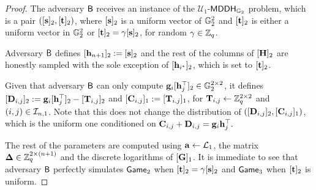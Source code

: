 \begin{proof}
The adversary $\mathsf{B}$ receives an instance of the $\mathcal{U}_1$-$\mathsf{MDDH}_{\mathbb{G}_2}$ problem, which is a pair
$([\mathbf{s}]_2, [\mathbf{t}]_2)$, where $[\mathbf{s}]_2$ is a uniform vector 
of $\mathbb{G}_2^{2}$ and $[\mathbf{t}]_2$ is either a uniform vector in $\mathbb{G}_2^2$ or 
$[\mathbf{t}]_2=\gamma[\mathbf{s}]_2$, for random $\gamma\in\mathbb{Z}_q$.      
 
Adversary $\mathsf{B}$ defines 
$[\mathbf{h}_{n+1}]_2:= [\mathbf{s}]_2$ and the rest of the columns of $[{\mathbf{{H}}}]_2$ are honestly sampled
with the sole exception of $[\mathbf{h}_{i^*}]_2$, which is set to $[\mathbf{t}]_2$.

Given that adversary $\mathsf{B}$ can only compute $\mathbf{g}_{i}[\mathbf{h}_j^\top]_2\in\mathbb{G}_2^{2\times2}$,
it defines $[\mathbf{{D}}_{i,j}]_2 := \mathbf{g}_{i}[\mathbf{h}_j^\top]_2 - [\mathbf{{T}}_{i,j}]_2$ and
$[\mathbf{{C}}_{i,j}]_1:=[\mathbf{{T}}_{i,j}]_1$, for $\mathbf{{T}}_{i,j}\gets\mathbb{Z}_q^{2\times 2}$ and $(i,j)\in\mathcal{I}_{n,1}$. Note 
that this does not change the distribution of $([\mathbf{{D}}_{i,j}]_2,[\mathbf{{C}}_{i,j}]_1)$, which is the uniform one conditioned
on $\mathbf{{C}}_{i,j}+\mathbf{{D}}_{i,j}= \mathbf{g}_i\mathbf{h}_j^\top.$

The rest of the parameters are computed using $\mathbf{a}\gets\mathcal{L}_1$,
the matrix $\mathbf{{\Delta}} \in \mathbb{Z}_q^{2 \times (n+1)}$ and the discrete logarithms
of $[\mathbf{{G}}]_1$.
It is immediate to see that adversary $\mathsf{B}$ perfectly simulates $\mathsf{Game}_2$ when $[\mathbf{t}]_2=\gamma[\mathbf{s}]_2$ and $\mathsf{Game}_3$ when $[\mathbf{t}]_2$ is uniform.  
\end{proof}

